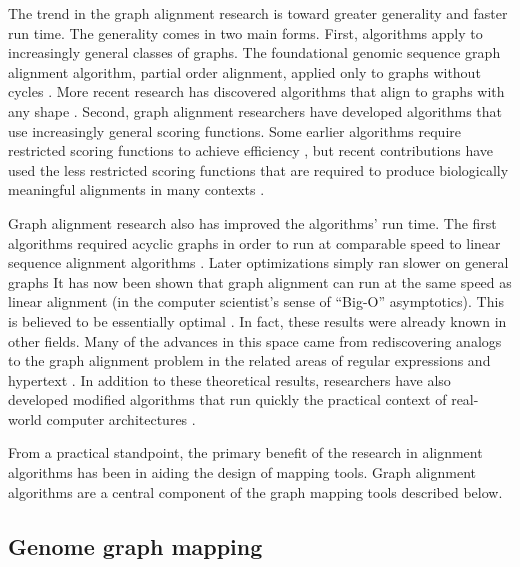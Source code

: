 The trend in the graph alignment research is toward greater generality and faster run time. 
The generality comes in two main forms. 
First, algorithms apply to increasingly general classes of graphs. 
The foundational genomic sequence graph alignment algorithm, partial order alignment, applied only to graphs without cycles \cite{Lee_2002, Grasso_2004}. 
More recent research has discovered algorithms that align to graphs with any shape \cite{Antipov_2015,Rautiainen_2017,Jain_2019a}. 
Second, graph alignment researchers have developed algorithms that use increasingly general scoring functions. 
Some earlier algorithms require restricted scoring functions to achieve efficiency \cite{Rautiainen_2017}, but recent contributions have used the less restricted scoring functions that are required to produce biologically meaningful alignments in many contexts \cite{Jain_2019a}.

Graph alignment research also has improved the algorithms' run time. 
The first algorithms required acyclic graphs in order to run at comparable speed to linear sequence alignment algorithms \cite{Lee_2002}. 
Later optimizations simply ran slower on general graphs \cite{Kavya_2019}
It has now been shown that graph alignment can run at the same speed as linear alignment (in the computer scientist's sense of ``Big-O'' asymptotics).
This is believed to be essentially optimal \cite{Jain_2019a,Equi_2019}. 
In fact, these results were already known in other fields.
Many of the advances in this space came from rediscovering analogs to the graph alignment problem in the related areas of regular expressions and hypertext \cite{Myers_1989,Amir_1997}. 
In addition to these theoretical results, researchers have also developed modified algorithms that run quickly the practical context of real-world computer architectures \cite{Suzuki_2018,Rautiainen_2019,Jain_2019b}.

From a practical standpoint, the primary benefit of the research in alignment algorithms has been in aiding the design of mapping tools. 
Graph alignment algorithms are a central component of the graph mapping tools described below.

\subsection{Genome graph mapping}

